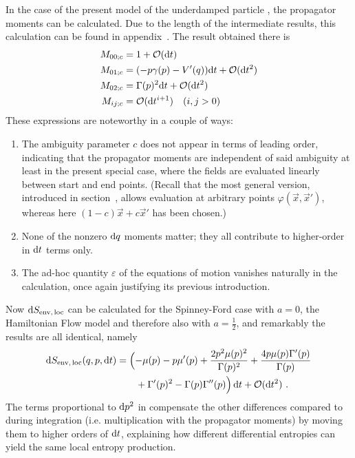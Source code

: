 In the case of the present model of the underdamped particle , the propagator moments can be calculated. Due to the length of the intermediate results, this calculation can be found in appendix~. The result obtained there is
%
\begin{align}
	M_{00;c} &= 1 + \mathcal{O}(\mathrm{d} t) \\
	M_{01;c} &= (-p\gamma(p) - V'(q)) \mathrm{d} t + \mathcal{O}(\mathrm{d} t^2) \\
	M_{02;c} &= \Gamma(p)^2 \mathrm{d} t + \mathcal{O}(\mathrm{d} t^2) \\
	M_{ij;c} &= \mathcal{O}(\mathrm{d} t^{i+1}) \quad (i,j > 0)
\end{align}
%
These expressions are noteworthy in a couple of ways:
\begin{enumerate}
	\item The ambiguity parameter \(c\) does not appear in terms of leading order, indicating that the propagator moments are independent of said ambiguity at least in the present special case, where the fields are evaluated linearly between start and end points. (Recall that the most general version, introduced in section~, allows evaluation at arbitrary points \(\varphi(\vec x,\vec x')\), whereas here \((1-c)\vec x + c\vec x'\) has been chosen.)
	\item None of the nonzero \(\mathrm{d} q\) moments matter; they all contribute to higher-order in \(\mathrm{d} t\) terms only.
	\item The ad-hoc quantity \(\varepsilon\) of the equations of motion  vanishes naturally in the calculation, once again justifying its previous introduction.
\end{enumerate}

Now \(\mathrm{d}S_\text{env,\,loc}\) can be calculated for the Spinney-Ford case with \(a=0\), the Hamiltonian Flow model and therefore also \SF with \(a = \tfrac12\), and remarkably the results are all identical, namely 
%
\begin{equation}\begin{split}
	\mathrm{d}S_\text{env,\,loc}(q,p,\mathrm{d} t)
		&=
		\Bigl(-\mu(p) - p \mu'(p) + \frac{2p^2\mu(p)^2}{\Gamma(p)^2} + \frac{4p\mu(p)\Gamma'(p)}{\Gamma(p)} \\
		&\qquad + \Gamma'(p)^2 - \Gamma(p)\Gamma''(p)\Bigr) \, \mathrm{d} t + \mathcal{O}(\mathrm{d} t^2) ~.
\end{split}\end{equation}
%
The terms proportional to \(\mathrm{d} p^2\) in  compensate the other differences compared to  during integration (i.e. multiplication with the propagator moments) by moving them to higher orders of \(\mathrm{d} t\), explaining how different differential entropies can yield the same local entropy production.






